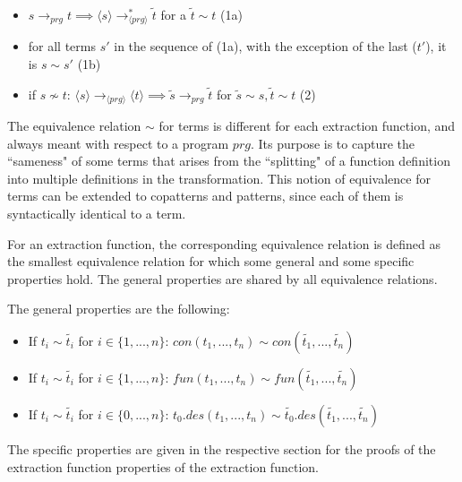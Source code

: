 \documentclass[11pt]{article} %
\begin{document}
\begin{itemize}
\item $s \longrightarrow_{prg} t \implies \langle s \rangle  \longrightarrow^*_{\langle prg \rangle} \tilde{t}$ for a $\tilde{t} \sim t$ (1a)

\item for all terms $s'$ in the sequence of (1a), with the exception of the last ($t'$), it is $s \sim s'$ (1b)

\item if $s \not\sim t$: $\langle s \rangle \longrightarrow_{\langle prg \rangle} \langle t \rangle \implies \tilde{s} \longrightarrow_{prg} \tilde{t}$ for $\tilde{s} \sim s, \tilde{t} \sim t$ (2)

\end{itemize}

The equivalence relation $\sim$ for terms is different for each extraction function, and always meant with respect to a program $prg$. Its purpose is to capture the ``sameness" of some terms that arises from the ``splitting" of a function definition into multiple definitions in the transformation. This notion of equivalence for terms can be extended to copatterns and patterns, since each of them is syntactically identical to a term.

For an extraction function, the corresponding equivalence relation is defined as the smallest equivalence relation for which some general and some specific properties hold. The general properties are shared by all equivalence relations.

The general properties are the following:

\begin{itemize}

\item If $t_i \sim \widetilde{t_i}$ for $i \in \{1, ..., n\}$: $con(t_1, ..., t_n) \sim con(\widetilde{t_1}, ..., \widetilde{t_n})$

\item If $t_i \sim \widetilde{t_i}$ for $i \in \{1, ..., n\}$: $fun(t_1, ..., t_n) \sim fun(\widetilde{t_1}, ..., \widetilde{t_n})$

\item If $t_i \sim \widetilde{t_i}$ for $i \in \{0, ..., n\}$: $t_0.des(t_1, ..., t_n) \sim \widetilde{t_0}.des(\widetilde{t_1}, ..., \widetilde{t_n})$

\end{itemize}

The specific properties are given in the respective section for the proofs of the extraction function properties of the extraction function.
\end{document}
